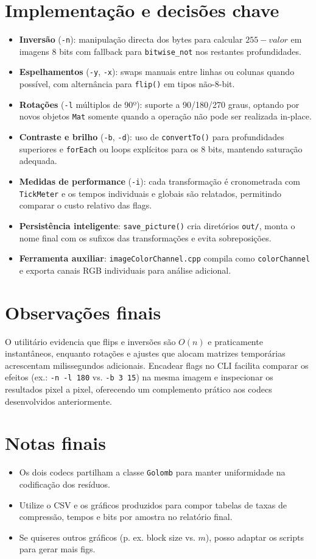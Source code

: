 \section{Implementação e decisões chave}
\begin{itemize}
  \item \textbf{Inversão} (\texttt{-n}): manipulação directa dos bytes para calcular \(255 - valor\) em imagens 8 bits com fallback para \texttt{bitwise\_not} nos restantes profundidades.
  \item \textbf{Espelhamentos} (\texttt{-y}, \texttt{-x}): swaps manuais entre linhas ou colunas quando possível, com alternância para \texttt{flip()} em tipos não-8-bit.
  \item \textbf{Rotações} (\texttt{-l} múltiplos de 90º): suporte a 90/180/270 graus, optando por novos objetos \texttt{Mat} somente quando a operação não pode ser realizada in-place.
  \item \textbf{Contraste e brilho} (\texttt{-b}, \texttt{-d}): uso de \texttt{convertTo()} para profundidades superiores e \texttt{forEach} ou loops explícitos para os 8 bits, mantendo saturação adequada.
  \item \textbf{Medidas de performance} (\texttt{-i}): cada transformação é cronometrada com \texttt{TickMeter} e os tempos individuais e globais são relatados, permitindo comparar o custo relativo das flags.
  \item \textbf{Persistência inteligente}: \texttt{save\_picture()} cria diretórios \texttt{out/}, monta o nome final com os sufixos das transformações e evita sobreposições.
  \item \textbf{Ferramenta auxiliar}: \texttt{imageColorChannel.cpp} compila como \texttt{colorChannel} e exporta canais RGB individuais para análise adicional.
\end{itemize}

\section{Observações finais}
O utilitário evidencia que flips e inversões são \(O(n)\) e praticamente instantâneos, enquanto rotações e ajustes que alocam matrizes temporárias acrescentam milissegundos adicionais. Encadear flags no CLI facilita comparar os efeitos (ex.: \texttt{-n -l 180} vs. \texttt{-b 3 15}) na mesma imagem e inspecionar os resultados pixel a pixel, oferecendo um complemento prático aos codecs desenvolvidos anteriormente.

\section{Notas finais}
\begin{itemize}
  \item Os dois codecs partilham a classe \texttt{Golomb} para manter uniformidade na codificação dos resíduos.
  \item Utilize o CSV e os gráficos produzidos para compor tabelas de taxas de compressão, tempos e bits por amostra no relatório final.
  \item Se quiseres outros gráficos (p. ex. block size vs. \(m\)), posso adaptar os scripts para gerar mais figs.
\end{itemize}

